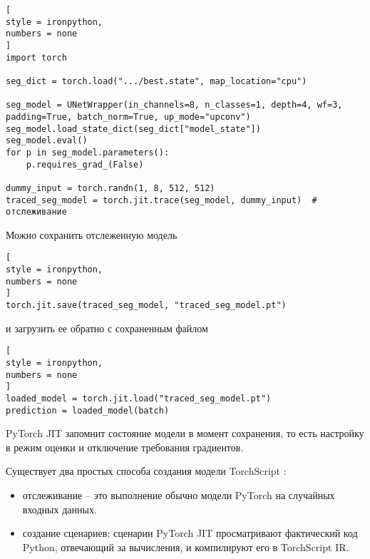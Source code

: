 \documentclass[%
	11pt,
	a4paper,
	utf8,
		]{article}
\begin{document}
\begin{lstlisting}[
style = ironpython,
numbers = none
]
import torch

seg_dict = torch.load(".../best.state", map_location="cpu")

seg_model = UNetWrapper(in_channels=8, n_classes=1, depth=4, wf=3, padding=True, batch_norm=True, up_mode="upconv")
seg_model.load_state_dict(seg_dict["model_state"])
seg_model.eval()
for p in seg_model.parameters():
    p.requires_grad_(False)
    
dummy_input = torch.randn(1, 8, 512, 512)
traced_seg_model = torch.jit.trace(seg_model, dummy_input)  # отслеживание
\end{lstlisting}

Можно сохранить отслеженную модель
\begin{lstlisting}[
style = ironpython,
numbers = none
]
torch.jit.save(traced_seg_model, "traced_seg_model.pt")
\end{lstlisting}
и загрузить ее обратно с сохраненным файлом
\begin{lstlisting}[
style = ironpython,
numbers = none
]
loaded_model = torch.jit.load("traced_seg_model.pt")
prediction = loaded_model(batch)
\end{lstlisting}

PyTorch JIT запомнит состояние модели в момент сохранения, то есть настройку в режим оценки и отключение требования градиентов.

Существует два простых способа создания модели TorchScript \cite[]{pytorch-2022}: 
\begin{itemize}
	\item отслеживание -- это выполнение обычно модели PyTorch на случайных входных данных.
	
	\item создание сценариев: сценарии PyTorch JIT просматривают фактический код Python, отвечающий за вычисления, и компилируют его в TorchScript IR.
\end{itemize}








\begin{thebibliography}{99}
	
\end{thebibliography}


\end{document}
